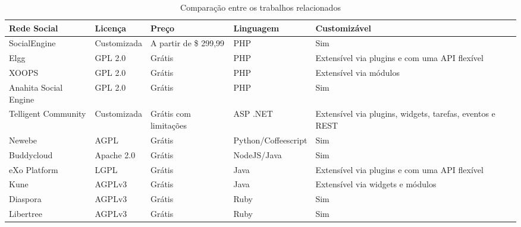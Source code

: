 \begin{table}[]
\centering
\caption{Comparação entre os trabalhos relacionados}
\label{comparacao}
\begin{adjustbox}{width=\textwidth}
\begin{tabular}{@{}llllll@{}}
\toprule
\textbf{Rede Social}  & \textbf{Licença} & \textbf{Preço}        & \textbf{Linguagem}  & \textbf{Customizável}                                    \\ \midrule
SocialEngine          & Customizada      & A partir de \$ 299,99 & PHP                 & Sim                                                      \\
Elgg                  & GPL 2.0          & Grátis                & PHP                 & Extensível via plugins e com uma API flexível            \\
XOOPS                 & GPL 2.0          & Grátis                & PHP                 & Extensível via módulos                                   \\
Anahita Social Engine & GPL 2.0          & Grátis                & PHP                 & Sim                                                      \\
Telligent Community   & Customizada      & Grátis com limitações & ASP .NET            & Extensível via plugins, widgets, tarefas, eventos e REST \\
Newebe                & AGPL             & Grátis                & Python/Coffeescript & Sim                                                      \\
Buddycloud            & Apache 2.0       & Grátis                & NodeJS/Java         & Sim                                                      \\
eXo Platform          & LGPL             & Grátis                & Java                & Extensível via plugins e com uma API flexível            \\
Kune                  & AGPLv3           & Grátis                & Java                & Extensível via widgets e módulos                         \\
Diaspora              & AGPLv3           & Grátis                & Ruby                & Sim                                                      \\
Libertree             & AGPLv3           & Grátis                & Ruby                & Sim                                                      \\ \bottomrule
\end{tabular}
\end{adjustbox}
\end{table}

